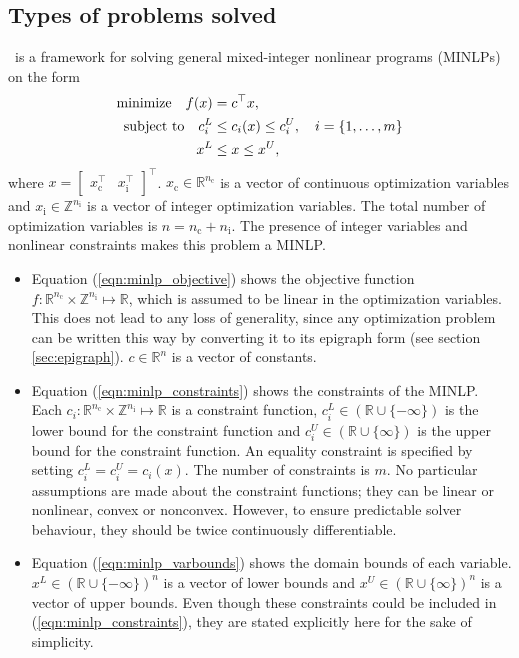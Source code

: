 \subsection{Types of problems solved}
\solvername\ is a framework for solving general mixed-integer nonlinear programs (MINLPs) on the form
\begin{subequations} \label{eqn:minlp}
\begin{align}
\mathrm{minimize} \ \ \  f(x) &= c^{\top} x, \label{eqn:minlp_objective} \\
\mathrm{subject\ to} \ \ \  c_i^L &\leq c_i(x) \leq c_i^U,\ \ \ i = \lbrace 1, \dots, m \rbrace \label{eqn:minlp_constraints} \\
x^L &\leq x \leq x^U \label{eqn:minlp_varbounds},
\end{align}
\end{subequations}
where $x = \begin{bmatrix} x_{\mathrm{c}}^{\top} & x_{\mathrm{i}}^{\top} \end{bmatrix}^{\top}$. $x_{\mathrm{c}} \in \mathbb{R}^{n_{\mathrm{c}}}$ is a vector of continuous optimization variables and $x_{\mathrm{i}} \in \mathbb{Z}^{n_{\mathrm{i}}}$ is a vector of integer optimization variables. The total number of optimization variables is $n = n_{\mathrm{c}} + n_{\mathrm{i}}$. The presence of integer variables and nonlinear constraints makes this problem a MINLP.
\begin{itemize}
\item
Equation (\ref{eqn:minlp_objective}) shows the objective function $f: \mathbb{R}^{n_{\mathrm{c}}} \times \mathbb{Z}^{n_{\mathrm{i}}} \mapsto \mathbb{R}$, which is assumed to be linear in the optimization variables. This does not lead to any loss of generality, since any optimization problem can be written this way by converting it to its epigraph form (see section \ref{sec:epigraph}). $c \in \mathbb{R}^n$ is a vector of constants.
\item
Equation (\ref{eqn:minlp_constraints}) shows the constraints of the MINLP. Each $c_i : \mathbb{R}^{n_{\mathrm{c}}} \times \mathbb{Z}^{n_{\mathrm{i}}} \mapsto \mathbb{R}$ is a constraint function, $c_i^L \in (\mathbb{R} \cup \lbrace -\infty \rbrace)$ is the lower bound for the constraint function and $c_i^U \in (\mathbb{R} \cup \lbrace \infty \rbrace)$ is the upper bound for the constraint function. An equality constraint is specified by setting $c_i^L = c_i^U = c_i(x)$. The number of constraints is $m$. No particular assumptions are made about the constraint functions; they can be linear or nonlinear, convex or nonconvex. However, to ensure predictable solver behaviour, they should be twice continuously differentiable.
\item
Equation (\ref{eqn:minlp_varbounds}) shows the domain bounds of each variable. $x^L \in (\mathbb{R} \cup \lbrace -\infty \rbrace )^n$ is a vector of lower bounds and $x^U \in (\mathbb{R}  \cup \lbrace \infty \rbrace )^n$ is a vector of upper bounds. Even though these constraints could be included in (\ref{eqn:minlp_constraints}),  they are stated explicitly here for the sake of simplicity.
\end{itemize}

